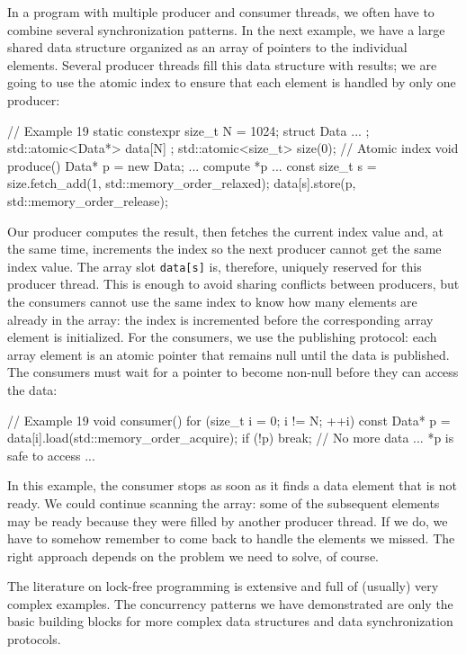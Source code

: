 In a program with multiple producer and consumer threads, we often have to combine several synchronization patterns. In the next example, we have a large shared data structure organized as an array of pointers to the individual elements. Several producer threads fill this data structure with results; we are going to use the atomic index to ensure that each element is handled by only one producer:

\begin{code}
// Example 19
static constexpr size_t N = 1024;
struct Data { ... };
std::atomic<Data*> data[N] {};
std::atomic<size_t> size(0);     // Atomic index
void produce() {
  Data* p = new Data;
  ... compute *p ...
  const size_t s =
    size.fetch_add(1, std::memory_order_relaxed);
  data[s].store(p, std::memory_order_release);
}
\end{code}

Our producer computes the result, then fetches the current index value and, at the same time, increments the index so the next producer cannot get the same index value. The array slot \texttt{data{[}s{]}} is, therefore, uniquely reserved for this producer thread. This is enough to avoid sharing conflicts between producers, but the consumers cannot use the same index to know how many elements are already in the array: the index is incremented before the corresponding array element is initialized. For the consumers, we use the publishing protocol: each array element is an atomic pointer that remains null until the data is published. The consumers must wait for a pointer to become non-null before they can access the data:

\begin{code}
// Example 19
void consumer() {
  for (size_t i = 0; i != N; ++i) {
    const Data* p =
      data[i].load(std::memory_order_acquire);
    if (!p) break; // No more data
    ... *p is safe to access ...
  }
}
\end{code}

In this example, the consumer stops as soon as it finds a data element that is not ready. We could continue scanning the array: some of the subsequent elements may be ready because they were filled by another producer thread. If we do, we have to somehow remember to come back to handle the elements we missed. The right approach depends on the problem we need to solve, of course.

The literature on lock-free programming is extensive and full of (usually) very complex examples. The concurrency patterns we have demonstrated are only the basic building blocks for more complex data structures and data synchronization protocols.

